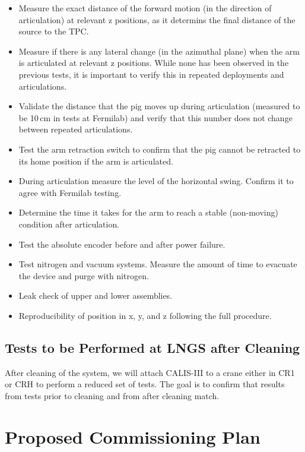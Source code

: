\begin{itemize}
\item 
Measure the exact distance of the forward motion (in the direction of articulation) at relevant z positions, as it determins the final distance of the source to the TPC.

\item
Measure if there is any lateral change (in the azimuthal plane) when the arm is articulated at relevant z positions. While none has been observed in the previous tests, it is important to verify this in repeated deployments and articulations.

\item 
Validate the distance that the pig moves up during articulation (measured to be 10\,cm in tests at Fermilab) and verify that this number does not change between repeated articulations.

  \item
Test the arm retraction switch to confirm that the pig cannot be retracted to its home position if the arm is articulated.
  
  \item
During articulation measure the level of the horizontal swing. Confirm it to agree with Fermilab testing.
 
  \item{Determine the time it takes for the arm to reach a stable (non-moving) condition after articulation.}
 
  \item{Test the absolute encoder before and after power failure.}
  \item{Test nitrogen and vacuum systems. Measure the amount of time to evacuate the device and purge with nitrogen.}
  \item{Leak check of upper and lower assemblies.}
  \item{Reproducibility of position in x, y, and z following the full procedure.}
 \end{itemize}
 
\subsection{Tests to be Performed at LNGS after Cleaning}
 After cleaning of the system, we will attach CALIS-III to a crane either in CR1 or CRH to perform a reduced set of tests.  The goal is to confirm that results from tests prior to cleaning and from after cleaning match. 
  
 
  
\section{Proposed Commissioning Plan} \label{Proposed Commissioning Plan}
